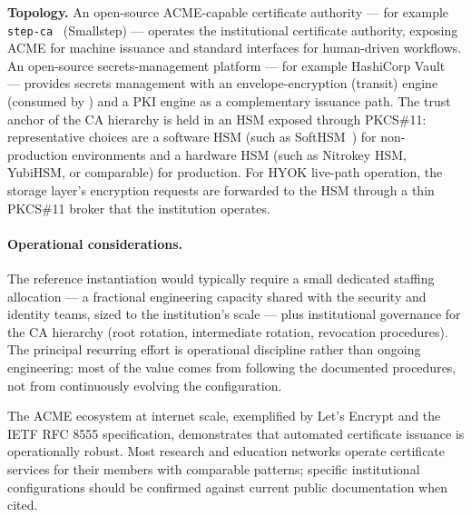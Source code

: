\begin{instantiationbox}
\noindent\textbf{Topology.} An open-source ACME-capable certificate
authority --- for example \texttt{step-ca}~\cite{step-ca}
(Smallstep) --- operates the institutional certificate authority,
exposing ACME for machine issuance and standard interfaces for
human-driven workflows. An open-source secrets-management platform
--- for example HashiCorp Vault~\cite{vault} --- provides secrets
management with an envelope-encryption (transit) engine
(consumed by ) and
a PKI engine as a complementary issuance path. The trust anchor of
the CA hierarchy is held in an HSM exposed through PKCS\#11:
representative choices are a software HSM
(such as SoftHSM~\cite{softhsm}) for non-production environments and
a hardware HSM (such as Nitrokey HSM, YubiHSM, or comparable) for
production. For HYOK live-path operation, the storage layer's
encryption requests are forwarded to the HSM through a thin
PKCS\#11 broker that the institution operates.
\end{instantiationbox}

\paragraph{Operational considerations.} The reference instantiation
would typically require a small dedicated staffing
allocation --- a fractional engineering capacity shared with the
security and identity teams, sized to the institution's scale ---
plus institutional governance for the CA hierarchy (root rotation,
intermediate rotation, revocation procedures). The principal
recurring effort is operational discipline rather than ongoing
engineering: most of the value comes from following the
documented procedures, not from continuously evolving the
configuration.

\begin{realworldbox}
\noindent The ACME ecosystem at internet scale, exemplified by
Let's Encrypt and the IETF RFC 8555 specification, demonstrates
that automated certificate issuance is operationally robust. Most
research and education networks operate certificate services for
their members with comparable patterns; specific institutional
configurations should be confirmed against current public
documentation when cited.
\end{realworldbox}

